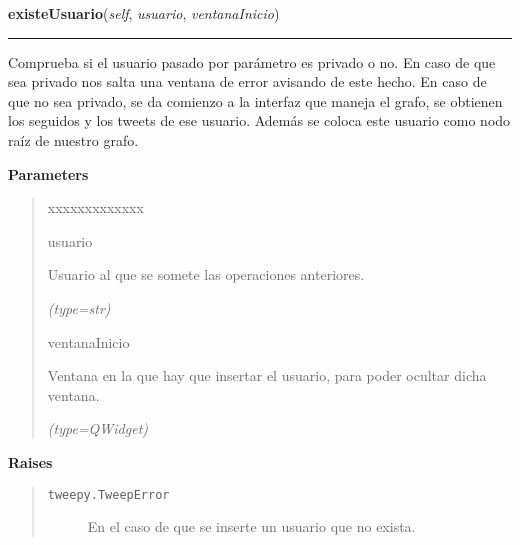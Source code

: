 \hspace{.8\funcindent}\begin{boxedminipage}{\funcwidth}

    \raggedright \textbf{existeUsuario}(\textit{self}, \textit{usuario}, \textit{ventanaInicio})

    \vspace{-1.5ex}

    \rule{\textwidth}{0.5\fboxrule}
\setlength{\parskip}{2ex}
    Comprueba si el usuario pasado por parámetro es privado o no. En caso 
    de que sea privado nos salta una ventana de error avisando de este 
    hecho. En caso de que no sea privado, se da comienzo a la interfaz que 
    maneja el grafo, se obtienen los seguidos y los tweets de ese usuario. 
    Además se coloca este usuario como nodo raíz de nuestro grafo.

\setlength{\parskip}{1ex}
      \textbf{Parameters}
      \vspace{-1ex}

      \begin{quote}
        \begin{Ventry}{xxxxxxxxxxxxx}

          \item[usuario]

          Usuario al que se somete las operaciones anteriores.

            {\it (type=str)}

          \item[ventanaInicio]

          Ventana en la que hay que insertar el usuario, para poder ocultar
          dicha ventana.

            {\it (type=QWidget)}

        \end{Ventry}

      \end{quote}

      \textbf{Raises}
    \vspace{-1ex}

      \begin{quote}
        \begin{description}

          \item[\texttt{tweepy.TweepError}]

          En el caso de que se inserte un usuario que no exista.

        \end{description}

      \end{quote}

    \end{boxedminipage}

